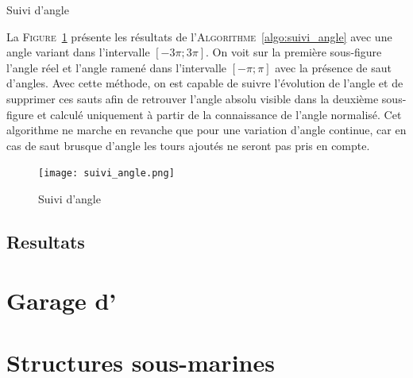 				\begin{algorithm}[!htb]
			
					\caption{Suivi d'angle} 
					\label{algo:suivi_angle}
				\end{algorithm}
			
				La \textsc{Figure}~\ref{fig:suivi_angle} présente les résultats de l'\textsc{Algorithme}~\ref{algo:suivi_angle} avec une angle variant dans l'intervalle $[-3\pi; 3\pi]$. On voit sur la première sous-figure l'angle réel et l'angle ramené dans l'intervalle $[-\pi; \pi]$ avec la présence de saut d'angles. Avec cette méthode, on est capable de suivre l'évolution de l'angle et de supprimer ces sauts afin de retrouver l'angle absolu visible dans la deuxième sous-figure et calculé uniquement à partir de la connaissance de l'angle normalisé. Cet algorithme ne marche en revanche que pour une variation d'angle continue, car en cas de saut brusque d'angle les tours ajoutés ne seront pas pris en compte.
			
				\begin{figure}[!htb]
					\centering
					\texttt{[image: suivi\_angle.png]}
					\caption{Suivi d'angle}
					\label{fig:suivi_angle}
				\end{figure}		
		
		\subsection{Resultats}

		\section{Garage d'\argos{}}

		\section{Structures sous-marines}
		